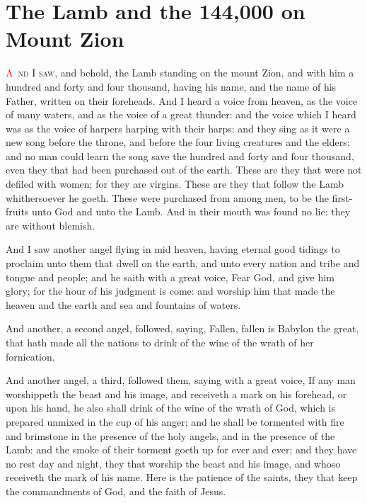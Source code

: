 
\chapter{The Lamb and the 144,000 on Mount Zion}
\lettrine[lines=3,slope=-0.5em]{\textcolor{red}{A}}{\ nd I saw}, and behold, the Lamb standing on the mount Zion, and with him a hundred and forty and four thousand, having his name, and the name of his Father, written on their foreheads. 
 And I heard a voice from heaven, as the voice of many waters, and as the voice of a great thunder: and the voice which I heard was as the voice of harpers harping with their harps: 
 and they sing as it were a new song before the throne, and before the four living creatures and the elders: and no man could learn the song save the hundred and forty and four thousand, even they that had been purchased out of the earth. 
 These are they that were not defiled with women; for they are virgins. These are they that follow the Lamb whithersoever he goeth. These were purchased from among men, to be the first-fruits unto God and unto the Lamb. 
 And in their mouth was found no lie: they are without blemish.

 And I saw another angel flying in mid heaven, having eternal good tidings to proclaim unto them that dwell on the earth, and unto every nation and tribe and tongue and people; 
 and he saith with a great voice, Fear God, and give him glory; for the hour of his judgment is come: and worship him that made the heaven and the earth and sea and fountains of waters.

 And another, a second angel, followed, saying, Fallen, fallen is Babylon the great, that hath made all the nations to drink of the wine of the wrath of her fornication.

 And another angel, a third, followed them, saying with a great voice, If any man worshippeth the beast and his image, and receiveth a mark on his forehead, or upon his hand, 
 he also shall drink of the wine of the wrath of God, which is prepared unmixed in the cup of his anger; and he shall be tormented with fire and brimstone in the presence of the holy angels, and in the presence of the Lamb: 
 and the smoke of their torment goeth up for ever and ever; and they have no rest day and night, they that worship the beast and his image, and whoso receiveth the mark of his name. 
 Here is the patience of the saints, they that keep the commandments of God, and the faith of Jesus.

